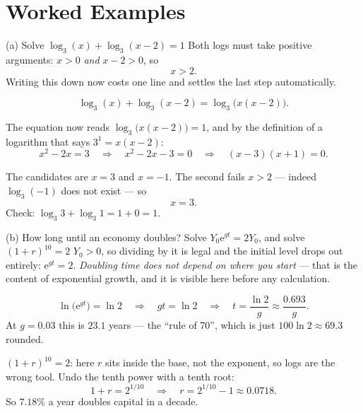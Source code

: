 \section{Worked Examples}

\begin{worked}{(a) Solve $\log_{3}(x)+\log_{3}(x-2)=1$}
Both logs must take positive arguments: $x>0$ \emph{and} $x-2>0$, so
\[
  x>2 .
\]
Writing this down now costs one line and settles the last step
automatically.

\[
  \log_{3}(x)+\log_{3}(x-2)=\log_{3}\bigl(x(x-2)\bigr).
\]

The equation now reads $\log_{3}\bigl(x(x-2)\bigr)=1$, and by the
definition of a logarithm that says $3^{1}=x(x-2)$:
\[
  x^{2}-2x=3\quad\Longrightarrow\quad x^{2}-2x-3=0
  \quad\Longrightarrow\quad (x-3)(x+1)=0 .
\]

The candidates are $x=3$ and $x=-1$. The second fails $x>2$ --- indeed
$\log_{3}(-1)$ does not exist --- so
\[
  \boxed{x=3}.
\]
Check: $\log_{3}3+\log_{3}1=1+0=1$. \checkmark
{}
\end{worked}

\begin{worked}{(b) How long until an economy doubles? Solve $Y_{0}\mathrm{e}^{gt}=2Y_{0}$, and solve $(1+r)^{10}=2$}
$Y_{0}>0$, so dividing by it is legal and the initial level drops out
entirely: $\mathrm{e}^{gt}=2$. \emph{Doubling time does not depend on where
you start} --- that is the content of exponential growth, and it is visible
here before any calculation.

\[
  \ln\bigl(\mathrm{e}^{gt}\bigr)=\ln 2
  \quad\Longrightarrow\quad
  gt=\ln 2
  \quad\Longrightarrow\quad
  t=\frac{\ln 2}{g}\approx\frac{0.693}{g}.
\]
At $g=0.03$ this is $23.1$ years --- the ``rule of 70'', which is just
$100\ln 2\approx69.3$ rounded.

$(1+r)^{10}=2$: here $r$ sits inside the base, not the exponent, so logs
are the wrong tool. Undo the tenth power with a tenth root:
\[
  1+r=2^{1/10}\quad\Longrightarrow\quad r=2^{1/10}-1\approx0.0718 .
\]
So $7.18\%$ a year doubles capital in a decade.
\end{worked}

